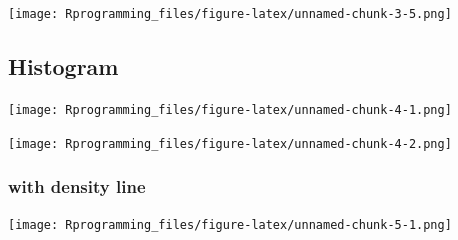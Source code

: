 \documentclass[10pt,]{krantz}
\makeatletter
\newenvironment{Shaded}{\begin{snugshade}}{\end{snugshade}}
\newcommand{\KeywordTok}[1]{\textcolor[rgb]{0.13,0.29,0.53}{\textbf{#1}}}
\newcommand{\DataTypeTok}[1]{\textcolor[rgb]{0.13,0.29,0.53}{#1}}
\newcommand{\DecValTok}[1]{\textcolor[rgb]{0.00,0.00,0.81}{#1}}
\newcommand{\StringTok}[1]{\textcolor[rgb]{0.31,0.60,0.02}{#1}}
\newcommand{\OtherTok}[1]{\textcolor[rgb]{0.56,0.35,0.01}{#1}}
\newcommand{\OperatorTok}[1]{\textcolor[rgb]{0.81,0.36,0.00}{\textbf{#1}}}
\newcommand{\NormalTok}[1]{#1}
\newenvironment{kframe}{%
\medskip{}
\setlength{\fboxsep}{.8em}
 \def\at@end@of@kframe{}%
 \ifinner\ifhmode%
  \def\at@end@of@kframe{\end{minipage}}%
  \begin{minipage}{\columnwidth}%
 \fi\fi%
 \def\FrameCommand##1{\hskip\@totalleftmargin \hskip-\fboxsep
 \colorbox{shadecolor}{##1}\hskip-\fboxsep
     \hskip-\linewidth \hskip-\@totalleftmargin \hskip\columnwidth}%
 \MakeFramed {\advance\hsize-\width
   \@totalleftmargin\z@ \linewidth\hsize
   \@setminipage}}%
 {\par\unskip\endMakeFramed%
 \at@end@of@kframe}
\renewenvironment{Shaded}{\begin{kframe}}{\end{kframe}}
\theoremstyle{definition}
\theoremstyle{definition}
\theoremstyle{remark}
\makeatother
\begin{document}
\texttt{[image: Rprogramming\_files/figure-latex/unnamed-chunk-3-5.png]}

\subsection{Histogram}\label{histogram}

\begin{Shaded}
\end{Shaded}

\texttt{[image: Rprogramming\_files/figure-latex/unnamed-chunk-4-1.png]}

\begin{Shaded}
\end{Shaded}

\texttt{[image: Rprogramming\_files/figure-latex/unnamed-chunk-4-2.png]}

\subsubsection{with density line}\label{with-density-line}

\begin{Shaded}
\end{Shaded}

\texttt{[image: Rprogramming\_files/figure-latex/unnamed-chunk-5-1.png]}
\end{document}
